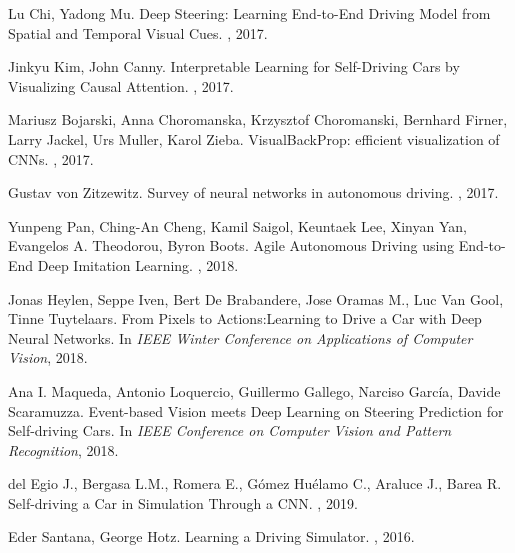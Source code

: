 \begin{thebibliography}{1}
Lu Chi, Yadong Mu.
\newblock Deep Steering: Learning End-to-End Driving Model from Spatial and Temporal Visual Cues.
, 2017.

Jinkyu Kim, John Canny.
\newblock Interpretable Learning for Self-Driving Cars by Visualizing Causal Attention.
, 2017.

Mariusz Bojarski, Anna Choromanska, Krzysztof Choromanski, Bernhard Firner, Larry Jackel, Urs Muller, Karol Zieba.
\newblock VisualBackProp: efficient visualization of CNNs.
, 2017.

Gustav von Zitzewitz.
\newblock Survey of neural networks in autonomous driving.
, 2017.

Yunpeng Pan, Ching-An Cheng, Kamil Saigol, Keuntaek Lee, Xinyan Yan, Evangelos A. Theodorou, Byron Boots.
\newblock Agile Autonomous Driving using End-to-End Deep Imitation Learning.
, 2018.

Jonas Heylen, Seppe Iven, Bert De Brabandere, Jose Oramas M., Luc Van Gool, Tinne Tuytelaars.
\newblock From Pixels to Actions:Learning to Drive a Car with Deep Neural Networks.
\newblock In {\em IEEE Winter Conference on Applications of Computer Vision}, 2018.

Ana I. Maqueda, Antonio Loquercio, Guillermo Gallego, Narciso García, Davide Scaramuzza.
\newblock Event-based Vision meets Deep Learning on Steering Prediction for Self-driving Cars.
\newblock In {\em  IEEE Conference on Computer Vision and Pattern Recognition}, 2018.

del Egio J., Bergasa L.M., Romera E., Gómez Huélamo C., Araluce J., Barea R.
\newblock Self-driving a Car in Simulation Through a CNN.
, 2019.

Eder Santana, George Hotz.
\newblock Learning a Driving Simulator.
, 2016.


\end{thebibliography}
